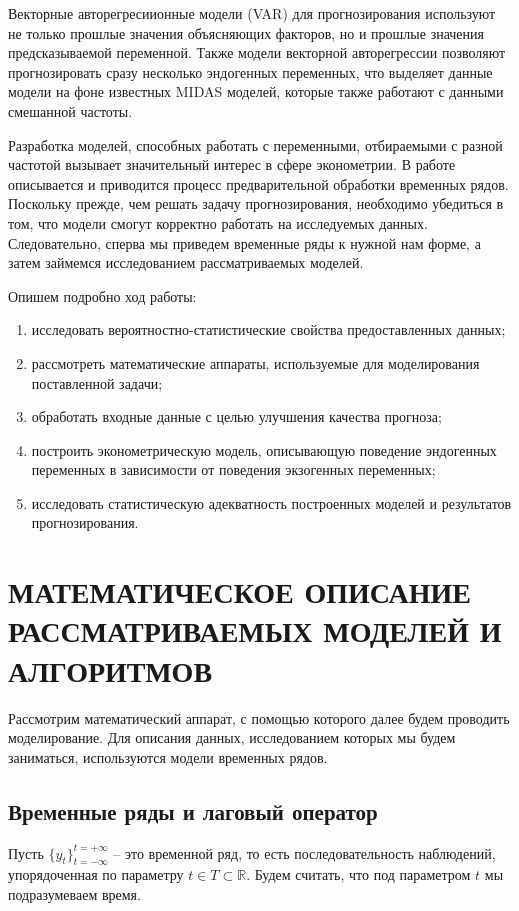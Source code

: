 \documentclass[a4paper, 14pt]{extreport}
\numberwithin{equation}{subsection}
\numberwithin{equation}{section}
\begin{document}
	Векторные авторегресиионные модели (VAR) для прогнозирования используют не только прошлые значения объясняющих факторов, но и прошлые значения предсказываемой переменной. Также модели векторной авторегрессии позволяют прогнозировать сразу несколько эндогенных переменных, что выделяет данные модели на фоне известных MIDAS моделей, которые также работают с данными смешанной частоты.
	
	Разработка моделей, способных работать с переменными, отбираемыми с разной частотой вызывает значительный интерес в сфере эконометрии. В работе описывается и приводится процесс предварительной обработки временных рядов. Поскольку прежде, чем решать задачу прогнозирования, необходимо убедиться в том, что модели смогут корректно работать на исследуемых данных. Следовательно, сперва мы приведем временные ряды к нужной нам форме, а затем займемся исследованием рассматриваемых моделей.
	
	Опишем подробно ход работы:
	\begin{enumerate}
		\item исследовать вероятностно-статистические свойства предоставленных данных;
		\item рассмотреть математические аппараты, используемые для моделирования поставленной задачи;
		\item обработать входные данные с целью улучшения качества прогноза;
		\item построить эконометрическую модель, описывающую поведение эндогенных переменных в зависимости от поведения экзогенных переменных;
		\item исследовать статистическую адекватность построенных моделей и результатов прогнозирования.
	\end{enumerate}
	\newpage

	\chapter{МАТЕМАТИЧЕСКОЕ ОПИСАНИЕ РАССМАТРИВАЕМЫХ МОДЕЛЕЙ И АЛГОРИТМОВ}
	Рассмотрим математический аппарат, с помощью которого далее будем проводить моделирование. Для описания данных, исследованием которых мы будем заниматься, используются модели временных рядов.
	\section{Временные ряды и лаговый оператор}
	Пусть $\{y_t\}_{t=-\infty}^{t=+\infty}$  -- это временной ряд, то есть последовательность наблюдений, упорядоченная по параметру $t\in T \subset \mathbb R$. Будем считать, что под параметром $t$ мы подразумеваем время.
	
\end{document}
